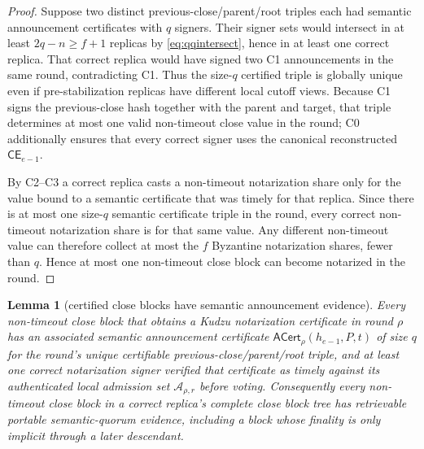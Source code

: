 \documentclass[11pt]{article}
\newtheorem{lemma}[theorem]{Lemma}
\theoremstyle{definition}
\theoremstyle{remark}
\newcommand{\CE}{\mathsf{CE}}
\newcommand{\ACert}{\mathsf{ACert}}
\begin{document}
\begin{proof}
Suppose two distinct previous-close/parent/root triples each had semantic announcement certificates with $q$ signers. Their signer sets would intersect in at least $2q-n\ge f+1$ replicas by \eqref{eq:qqintersect}, hence in at least one correct replica. That correct replica would have signed two C1 announcements in the same round, contradicting C1. Thus the size-$q$ certified triple is globally unique even if pre-stabilization replicas have different local cutoff views. Because C1 signs the previous-close hash together with the parent and target, that triple determines at most one valid non-timeout close value in the round; C0 additionally ensures that every correct signer uses the canonical reconstructed $\CE_{e-1}$.

By C2--C3 a correct replica casts a non-timeout notarization share only for the value bound to a semantic certificate that was timely for that replica. Since there is at most one size-$q$ semantic certificate triple in the round, every correct non-timeout notarization share is for that same value. Any different non-timeout value can therefore collect at most the $f$ Byzantine notarization shares, fewer than $q$. Hence at most one non-timeout close block can become notarized in the round.
\end{proof}

\begin{lemma}[certified close blocks have semantic announcement evidence]
\label{lem:close-acert}
Every non-timeout close block that obtains a Kudzu notarization certificate in round $\rho$ has an associated semantic announcement certificate $\ACert_\rho(h_{e-1},P,t)$ of size $q$ for the round's unique certifiable previous-close/parent/root triple, and at least one correct notarization signer verified that certificate as timely against its authenticated local admission set $\mathcal A_{\rho,r}$ before voting. Consequently every non-timeout close block in a correct replica's complete close block tree has retrievable portable semantic-quorum evidence, including a block whose finality is only implicit through a later descendant.
\end{lemma}
\end{document}
